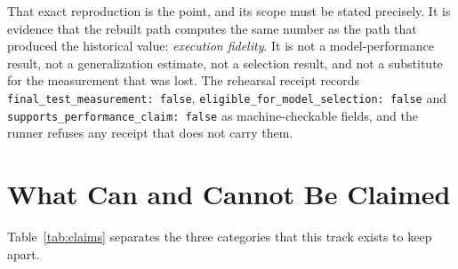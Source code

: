\documentclass[10pt,conference]{IEEEtran}
\begin{document}
That exact reproduction is the point, and its scope must be stated precisely.
It is evidence that the rebuilt path computes the same number as the path that
produced the historical value: \emph{execution fidelity}. It is not a
model-performance result, not a generalization estimate, not a selection
result, and not a substitute for the measurement that was lost. The rehearsal
receipt records \texttt{final\_test\_measurement: false},
\texttt{eligible\_for\_model\_selection: false} and
\texttt{supports\_performance\_claim: false} as machine-checkable fields, and
the runner refuses any receipt that does not carry them.

\section{What Can and Cannot Be Claimed}
\label{sec:claims}

Table~\ref{tab:claims} separates the three categories that this track exists to
keep apart.
\end{document}
